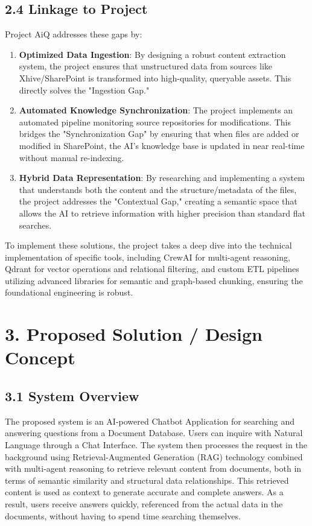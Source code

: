 \documentclass[12pt]{article}
\begin{document}
\subsection{2.4 Linkage to Project}
Project AiQ addresses these gaps by:
\begin{enumerate}
    \item \textbf{Optimized Data Ingestion}: By designing a robust content extraction system, the project ensures that unstructured data from sources like Xhive/SharePoint is transformed into high-quality, queryable assets. This directly solves the "Ingestion Gap."
    \item \textbf{Automated Knowledge Synchronization}: The project implements an automated pipeline monitoring source repositories for modifications. This bridges the "Synchronization Gap" by ensuring that when files are added or modified in SharePoint, the AI's knowledge base is updated in near real-time without manual re-indexing.
    \item \textbf{Hybrid Data Representation}: By researching and implementing a system that understands both the content and the structure/metadata of the files, the project addresses the "Contextual Gap," creating a semantic space that allows the AI to retrieve information with higher precision than standard flat searches.
\end{enumerate}

To implement these solutions, the project takes a deep dive into the technical implementation of specific tools, including CrewAI for multi-agent reasoning, Qdrant for vector operations and relational filtering, and custom ETL pipelines utilizing advanced libraries for semantic and graph-based chunking, ensuring the foundational engineering is robust.

\newpage
\section{3. Proposed Solution / Design Concept}

\subsection{3.1 System Overview}
The proposed system is an AI-powered Chatbot Application for searching and answering questions from a Document Database. Users can inquire with Natural Language through a Chat Interface. The system then processes the request in the background using Retrieval-Augmented Generation (RAG) technology combined with multi-agent reasoning to retrieve relevant content from documents, both in terms of semantic similarity and structural data relationships. This retrieved content is used as context to generate accurate and complete answers. As a result, users receive answers quickly, referenced from the actual data in the documents, without having to spend time searching themselves.
\end{document}
